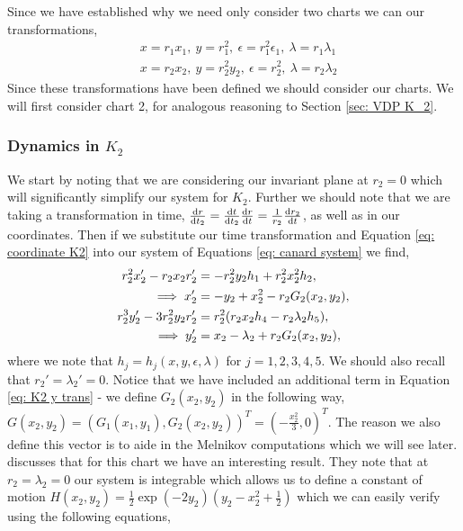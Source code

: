 Since we have established why we need only consider two charts we can our transformations,
\begin{subequations}
	\begin{align}
	&x=r_1x_1, \ y=r_1^2, \ \epsilon=r_1^2\epsilon_1, \ \lambda=r_1\lambda_1 \label{eq: coordiante K1}\\ 
	&x=r_2x_2, \ y=r_2^2y_2, \ \epsilon=r^2_2, \ \lambda=r_2\lambda_2 \label{eq: coordinate K2}
	\end{align}
\end{subequations}
Since these transformations have been defined we should consider our charts. We will first consider chart 2, for analogous reasoning to Section \ref{sec: VDP K_2}. 

\subsubsection{Dynamics in \texorpdfstring{$K_2$}{K2}}
We start by noting that we are considering our invariant plane at $r_2=0$ which will significantly simplify our system for $K_2$. Further we should note that we are taking a transformation in time, $\od{r}{t_2}=\od{t}{t_2}\od{r}{t}=\frac{1}{r_2}\od{r_2}{t}$, as well as in our coordinates. Then if we substitute our time transformation and Equation  \ref{eq: coordinate K2} into our system of Equations \ref{eq: canard system} we find, 
\begin{subequations}
	\begin{align}
	r_2^2x_2' - r_2x_2r_2'&=-r_2^2y_2h_1+r^2_2x^2_2h_2,\notag\\
	\implies x'_2&=-y_2+x_2^2-r_2G_2(x_2,y_2),\\
	r^3_2y_2'-3r_2^2y_2r_2'&=r^2_2(r_2x_2h_4-r_2\lambda_2h_5),\notag\\
	\implies y_2'&=x_2-\lambda_2+r_2G_2(x_2,y_2), \label{eq: K2 y trans}
	\end{align}
	\label{eq: reduced canard k2}
\end{subequations}
where we note that $h_j=h_j(x,y,\epsilon,\lambda)$ for $j=1,2,3,4,5$. We should also recall that $r_2'=\lambda_2'=0$. Notice that we have included an additional term in Equation \ref{eq: K2 y trans} - we define $G_2(x_2,y_2)$ in the following way, $G(x_2,y_2)=(G_1(x_1,y_1),G_2(x_2,y_2))^T=(-\frac{x^2_2}{3},0)^T$. The reason we also define this vector is to aide in the Melnikov computations which we will see later. \citet{krupa2001} discusses that for this chart we have an interesting result. They note that at $r_2=\lambda_2=0$ our system is integrable which allows us to define a constant of motion $H(x_2,y_2)=\frac{1}{2}\exp{(-2y_2)}\left(y_2-x^2_2+\frac{1}{2}\right)$ which we can easily verify \citep{krupa2001} using the following equations,
